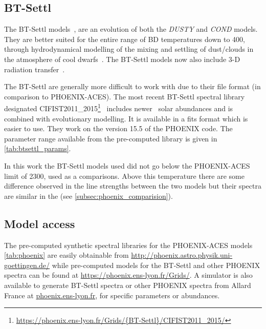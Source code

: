 \subsection{BT-Settl}
\label{subsec:btsettl}
The {BT-Settl} models~\citep{allard_models_2012,allard_atmospheres_2012,rajpurohit_effective_2013,baraffe_new_2015}, are an evolution of both the \emph{DUSTY} and \emph{COND} models.
They are better suited for the entire range of {BD} temperatures down to 400\K{}, through hydrodynamical modelling of the mixing and settling of dust/clouds in the atmosphere of cool dwarfs~\citep{freytag_role_2010}.
The {BT-Settl} models now also include 3-D radiation transfer~\citep{seelmann_3d_2010}.


The {BT-Settl} are generally more difficult to work with due to their file format (in comparison to {PHOENIX-ACES}).
The most recent {BT-Settl} spectral library designated {CIFIST2011\_2015}\footnote{\url{https://phoenix.ens-lyon.fr/Grids/{BT-Settl}/CIFIST2011_2015/}}~\citep{baraffe_new_2015} includes newer~\citet{caffau_solar_2011} solar abundances and is combined with evolutionary modelling.
It is available in a fits format which is easier to use.
They work on the version 15.5 of the {PHOENIX} code.
The parameter range available from the pre-computed library is given in \cref{tab:btsettl_params}.



In this work the {BT-Settl} models used did not go below the {PHOENIX-ACES} limit of 2300\K{}, used as a comparisons.
Above this temperature there are some difference observed in the line strengths between the two models but their spectra are similar in the \nir{} (see \cref{subsec:phoenix_comparision}).


\subsection{Model access}
\label{subsec:model_access}
The pre-computed synthetic spectral libraries for the {PHOENIX-ACES} models \cref{tab:phoenix} are easily obtainable from \href{http://phoenix.astro.physik.uni-goettingen.de/}{http://phoenix.astro.physik.uni-goettingen.de/} while pre-computed models for the {BT-Settl} and other {PHOENIX} spectra can be found  at \href{https://phoenix.ens-lyon.fr/Grids/}{https://phoenix.ens-lyon.fr/Grids/}.
A simulator is also available to generate {BT-Settl} spectra or other {PHOENIX} spectra from {Allard France} at \href{phoenix.ens-lyon.fr}{phoenix.ens-lyon.fr}, for specific parameters or abundances.

